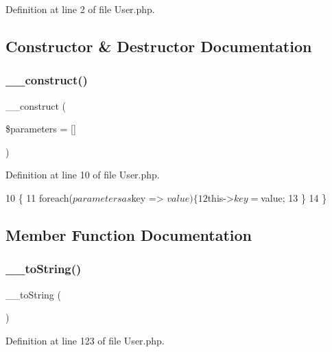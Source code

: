 Definition at line 2 of file User.\+php.



\subsection{Constructor \& Destructor Documentation}
\hypertarget{class_user_a733e4e74c86a61ec95cd1f4b84a71383}{}\label{class_user_a733e4e74c86a61ec95cd1f4b84a71383} 
\subsubsection{\texorpdfstring{\+\_\+\+\_\+construct()}{\_\_construct()}}
{\footnotesize\ttfamily \+\_\+\+\_\+construct (\begin{DoxyParamCaption}\item[{}]{\$parameters = {\ttfamily \mbox{[}\mbox{]}} }\end{DoxyParamCaption})}



Definition at line 10 of file User.\+php.


\begin{DoxyCode}
10                                                   \{
11         \textcolor{keywordflow}{foreach}($parameters as $key => $value) \{
12             $this->$key = $value;
13         \}
14     \}
\end{DoxyCode}


\subsection{Member Function Documentation}
\hypertarget{class_user_a7516ca30af0db3cdbf9a7739b48ce91d}{}\label{class_user_a7516ca30af0db3cdbf9a7739b48ce91d} 
\subsubsection{\texorpdfstring{\+\_\+\+\_\+to\+String()}{\_\_toString()}}
{\footnotesize\ttfamily \+\_\+\+\_\+to\+String (\begin{DoxyParamCaption}{ }\end{DoxyParamCaption})}



Definition at line 123 of file User.\+php.



